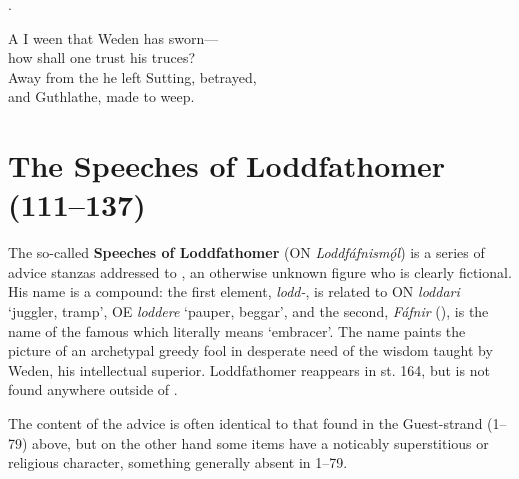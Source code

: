 \bvg\bva{}%
.\eva

\bvb A  I ween that Weden has sworn— \\
\ind how shall one trust his truces? \\
Away from the  he left Sutting, betrayed, \\
\ind and Guthlathe, made to weep.\evb\evg

\sectionline

\section{The Speeches of Loddfathomer (111–137)}

The so-called \textbf{Speeches of Loddfathomer} (ON \emph{Loddfáfnismǫ́l}) is a series of advice stanzas addressed to , an otherwise unknown figure who is clearly fictional.  His name is a compound: the first element, \emph{lodd-}, is related to ON \emph{loddari} ‘juggler, tramp’, OE \emph{loddere} ‘pauper, beggar’, and the second, \emph{Fáfnir} (), is the name of the famous  which literally means ‘embracer’.  The name paints the picture of an archetypal greedy fool in desperate need of the wisdom taught by Weden, his intellectual superior.  Loddfathomer reappears in st. 164, but is not found anywhere outside of \Havamal.

The content of the advice is often identical to that found in the Guest-strand (1–79) above, but on the other hand some items have a noticably superstitious or religious character, something generally absent in 1–79.

